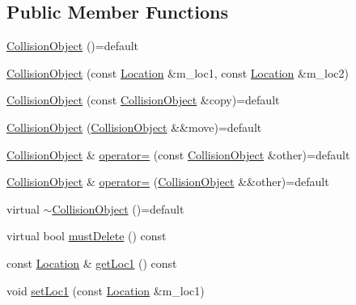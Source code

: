 \subsection*{Public Member Functions}
\begin{DoxyCompactItemize}
\item 
\hyperlink{classroadfighter_1_1CollisionObject_aa627fcee5f0f313b29d601452dadc3b0}{Collision\+Object} ()=default
\item 
\hyperlink{classroadfighter_1_1CollisionObject_a79e8e65670d1b424f1c4fadf1adde094}{Collision\+Object} (const \hyperlink{classroadfighter_1_1Location}{Location} \&m\+\_\+loc1, const \hyperlink{classroadfighter_1_1Location}{Location} \&m\+\_\+loc2)
\item 
\hyperlink{classroadfighter_1_1CollisionObject_ac19de6256e1421e1c91e98e3ba136326}{Collision\+Object} (const \hyperlink{classroadfighter_1_1CollisionObject}{Collision\+Object} \&copy)=default
\item 
\hyperlink{classroadfighter_1_1CollisionObject_a45af317bbabd99cf64e0ba87241df509}{Collision\+Object} (\hyperlink{classroadfighter_1_1CollisionObject}{Collision\+Object} \&\&move)=default
\item 
\hyperlink{classroadfighter_1_1CollisionObject}{Collision\+Object} \& \hyperlink{classroadfighter_1_1CollisionObject_a880034efde5a30ccc98c2ff3a2dc7c84}{operator=} (const \hyperlink{classroadfighter_1_1CollisionObject}{Collision\+Object} \&other)=default
\item 
\hyperlink{classroadfighter_1_1CollisionObject}{Collision\+Object} \& \hyperlink{classroadfighter_1_1CollisionObject_a68b62353ad431b65f2dbacee983b6660}{operator=} (\hyperlink{classroadfighter_1_1CollisionObject}{Collision\+Object} \&\&other)=default
\item 
virtual \hyperlink{classroadfighter_1_1CollisionObject_aabc3bc7bef3a50923856fd82e39f59a1}{$\sim$\+Collision\+Object} ()=default
\item 
virtual bool \hyperlink{classroadfighter_1_1CollisionObject_a738071cd7b1b8cd4c8d455b5e552bd4c}{must\+Delete} () const
\item 
const \hyperlink{classroadfighter_1_1Location}{Location} \& \hyperlink{classroadfighter_1_1CollisionObject_a73baa1faea7a399a944e6a6f1d04ad86}{get\+Loc1} () const
\item 
void \hyperlink{classroadfighter_1_1CollisionObject_a3e0d924b453c9003a4992046fa3c52e1}{set\+Loc1} (const \hyperlink{classroadfighter_1_1Location}{Location} \&m\+\_\+loc1)
\item 

\end{DoxyCompactItemize}
